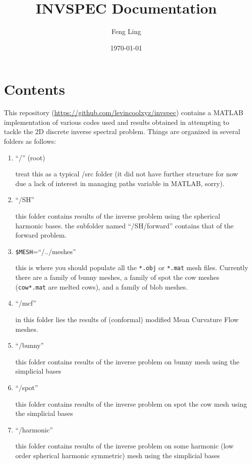\documentclass[11pt]{article}
\title{INVSPEC Documentation}
\author{Feng Ling}
\date{\monthyear\today}
\theoremstyle{definition}
\begin{document}
\maketitle
\thispagestyle{empty}

\section{Contents}
This repository (\url{https://github.com/levincoolxyz/invspec}) contains a MATLAB implementation of various codes used and results obtained in attempting to tackle the 2D discrete inverse spectral problem. Things are organized in several folders as follows:

\begin{enumerate}
	\item ``/'' (root)
	
	  treat this as a typical /src folder (it did not have further structure for now due a lack of interest in managing paths variable in MATLAB, sorry).
	  
	\item ``/SH''
		
	  this folder contains results of the inverse problem using the spherical harmonic bases. the subfolder named ``/SH/forward'' contains that of the forward problem.
	  
	\item \verb|$MESH|=``/../meshes''
	
	  this is where you should populate all the \verb|*.obj| or \verb|*.mat| mesh files. 
	  Currently there are a family of bunny meshes, a family of spot the cow meshes (\verb|cow*.mat| are melted cows), and a family of blob meshes.
	  
	\item ``/mcf''
	
	  in this folder lies the results of (conformal) modified Mean Curvature Flow meshes.
	  
	\item ``/bunny''
	
	this folder contains results of the inverse problem on bunny mesh using the simplicial bases
	
	\item ``/spot''
	
	this folder contains results of the inverse problem on spot the cow mesh using the simplicial bases
	
	\item ``/harmonic''
	
	this folder contains results of the inverse problem on some harmonic (low order spherical harmonic symmetric) mesh using the simplicial bases
	
\end{enumerate}
\end{document}
